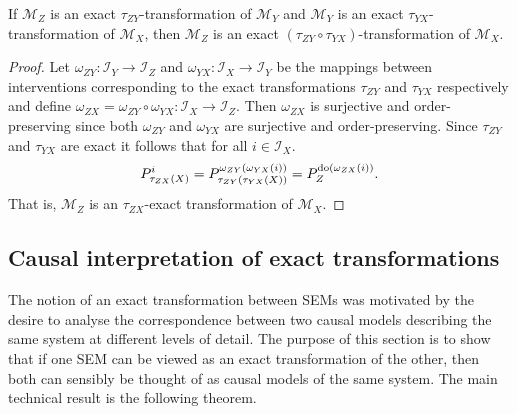 \medskip

\begin{lemma}\label{theorem:transitivity}
    If $\mathcal{M}_Z$ is an exact $\tau_{ZY}$-transformation of $\mathcal{M}_Y$ and $\mathcal{M}_Y$ is an exact $\tau_{YX}$-transformation of $\mathcal{M}_X$, then $\mathcal{M}_Z$ is an exact $(\tau_{ZY}\circ\tau_{YX})$-transformation of $\mathcal{M}_X$.
\end{lemma}

\begin{proof}
    Let $\omega_{ZY}:\mathcal{I}_Y \to \mathcal{I}_Z$ and $\omega_{YX}:\mathcal{I}_X \to \mathcal{I}_Y$ be the mappings between interventions corresponding to the exact transformations $\tau_{ZY}$ and $\tau_{YX}$ respectively and define $\omega_{ZX} = \omega_{ZY}\circ\omega_{YX}:\mathcal{I}_X \to \mathcal{I}_Z$.
    Then $\omega_{ZX}$ is surjective and order-preserving since both $\omega_{ZY}$ and $\omega_{YX}$ are surjective and order-preserving.
    Since $\tau_{ZY}$ and $\tau_{YX}$ are exact it follows that for all $i\in\mathcal{I}_X$.
    \begin{align*}
        P^{i}_{\tau_{ZX}(X)}
        =
        P^{ \omega_{ZY}(\omega_{YX}(i))}_{\tau_{ZY}(\tau_{YX}(X))}
        =
        P^{\operatorname{do}(\omega_{ZX}(i))}_{Z}.
    \end{align*}
    That is, $\mathcal{M}_Z$ is an $\tau_{ZX}$-exact transformation of $\mathcal{M}_X$.
\end{proof}



\subsection{Causal interpretation of exact transformations}
The notion of an exact transformation between SEMs was motivated by the desire to analyse the correspondence between two causal models describing the same system at different levels of detail.
The purpose of this section is to show that if one SEM can be viewed as an exact transformation of the other, then both can sensibly be thought of as causal models of the same system. 
The main technical result is the following theorem.

\medskip

